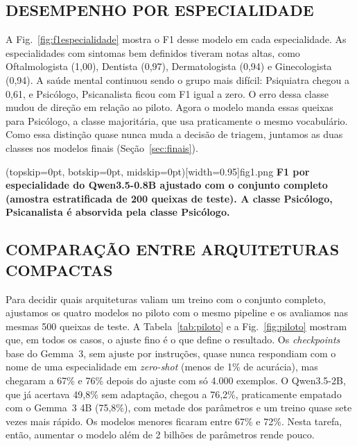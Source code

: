 \documentclass{ieeeaccess}
\begin{document}
\subsection{DESEMPENHO POR ESPECIALIDADE}
A Fig.~\ref{fig:f1especialidade} mostra o F1 desse modelo em cada especialidade. As especialidades com sintomas bem definidos tiveram notas altas, como Oftalmologista (1,00), Dentista (0,97), Dermatologista (0,94) e Ginecologista (0,94). A sa\'ude mental continuou sendo o grupo mais dif\'icil: Psiquiatra chegou a 0,61, e Psic\'ologo, Psicanalista ficou com F1 igual a zero. O erro dessa classe mudou de dire\c{c}\~ao em rela\c{c}\~ao ao piloto. Agora o modelo manda essas queixas para Psic\'ologo, a classe majorit\'aria, que usa praticamente o mesmo vocabul\'ario. Como essa distin\c{c}\~ao quase nunca muda a decis\~ao de triagem, juntamos as duas classes nos modelos finais (Se\c{c}\~ao~\ref{sec:finais}).

\Figure[t!](topskip=0pt, botskip=0pt, midskip=0pt)[width=0.95\columnwidth]{fig1.png}
{\textbf{F1 por especialidade do Qwen3.5-0.8B ajustado com o conjunto completo (amostra estratificada de 200 queixas de teste). A classe Psic\'ologo, Psicanalista \'e absorvida pela classe Psic\'ologo.}\label{fig:f1especialidade}}

\subsection{COMPARA\c{C}\~AO ENTRE ARQUITETURAS COMPACTAS}
Para decidir quais arquiteturas valiam um treino com o conjunto completo, ajustamos os quatro modelos no piloto com o mesmo pipeline e os avaliamos nas mesmas 500 queixas de teste. A Tabela~\ref{tab:piloto} e a Fig.~\ref{fig:piloto} mostram que, em todos os casos, o ajuste fino \'e o que define o resultado. Os \emph{checkpoints} base do Gemma~3, sem ajuste por instru\c{c}\~oes, quase nunca respondiam com o nome de uma especialidade em \emph{zero-shot} (menos de 1\% de acur\'acia), mas chegaram a 67\% e 76\% depois do ajuste com s\'o 4.000 exemplos. O Qwen3.5-2B, que j\'a acertava 49,8\% sem adapta\c{c}\~ao, chegou a 76,2\%, praticamente empatado com o Gemma~3 4B (75,8\%), com metade dos par\^ametros e um treino quase sete vezes mais r\'apido. Os modelos menores ficaram entre 67\% e 72\%. Nesta tarefa, ent\~ao, aumentar o modelo al\'em de 2 bilh\~oes de par\^ametros rende pouco.
\end{document}
